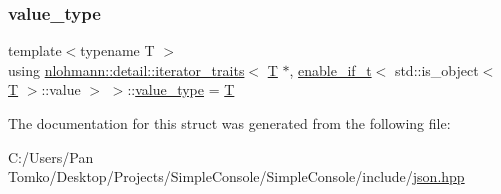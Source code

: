 \subsubsection{\texorpdfstring{value\_type}{value\_type}}
{\footnotesize\ttfamily template$<$typename T $>$ \\
using \mbox{\hyperlink{structnlohmann_1_1detail_1_1iterator__traits}{nlohmann\+::detail\+::iterator\+\_\+traits}}$<$ \mbox{\hyperlink{_keyboard_event_8h_adf1f3edb9115acb0a1e04209b7a9937b}{T}} $\ast$, \mbox{\hyperlink{namespacenlohmann_1_1detail_a02bcbc878bee413f25b985ada771aa9c}{enable\+\_\+if\+\_\+t}}$<$ std\+::is\+\_\+object$<$ \mbox{\hyperlink{_keyboard_event_8h_adf1f3edb9115acb0a1e04209b7a9937b}{T}} $>$\+::value $>$ $>$\+::\mbox{\hyperlink{structnlohmann_1_1detail_1_1iterator__traits_3_01_t_01_5_00_01enable__if__t_3_01std_1_1is__objec8d960665487688165530972cda4f1bea_a443e6a62f5fb2c545fc71c751b98ca8d}{value\+\_\+type}} =  \mbox{\hyperlink{_keyboard_event_8h_adf1f3edb9115acb0a1e04209b7a9937b}{T}}}



The documentation for this struct was generated from the following file\+:\begin{DoxyCompactItemize}
\item 
C\+:/\+Users/\+Pan Tomko/\+Desktop/\+Projects/\+Simple\+Console/\+Simple\+Console/include/\mbox{\hyperlink{json_8hpp}{json.\+hpp}}\end{DoxyCompactItemize}
